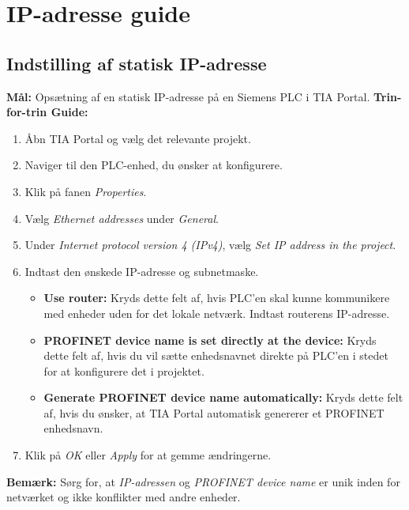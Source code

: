\section{IP-adresse guide}
\subsection*{Indstilling af statisk IP-adresse}
\label{subsec:static_ip}
\textbf{Mål:} Opsætning af en statisk IP-adresse på en Siemens PLC i TIA Portal.
\newline\newline\noindent
\textbf{Trin-for-trin Guide:}
\begin{enumerate}
	\item Åbn TIA Portal og vælg det relevante projekt.
	\item Naviger til den PLC-enhed, du ønsker at konfigurere.
	\item Klik på fanen \textit{Properties}.
	\item Vælg \textit{Ethernet addresses} under \textit{General}.
	\item Under \textit{Internet protocol version 4 (IPv4)}, vælg \textit{Set IP address in the project}.
	\item Indtast den ønskede IP-adresse og subnetmaske.
	\begin{itemize}
		\item \textbf{Use router:} Kryds dette felt af, hvis PLC'en skal kunne kommunikere med enheder uden for det lokale netværk. Indtast routerens IP-adresse.
		\item \textbf{PROFINET device name is set directly at the device:} Kryds dette felt af, hvis du vil sætte enhedsnavnet direkte på PLC'en i stedet for at konfigurere det i projektet.
		\item \textbf{Generate PROFINET device name automatically:} Kryds dette felt af, hvis du ønsker, at TIA Portal automatisk genererer et PROFINET enhedsnavn.
	\end{itemize}
	\item Klik på \textit{OK} eller \textit{Apply} for at gemme ændringerne.
\end{enumerate}
\textbf{Bemærk:} Sørg for, at \textit{IP-adressen} og \textit{PROFINET device name} er unik inden for netværket og ikke konflikter med andre enheder.

